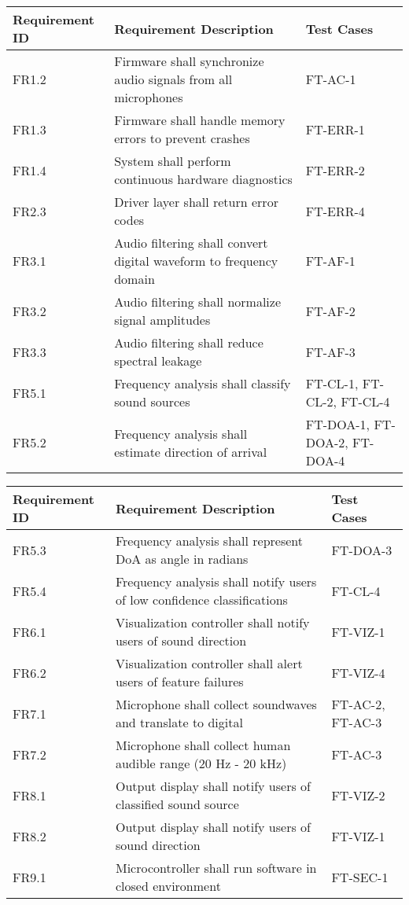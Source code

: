 \documentclass[12pt, titlepage]{article}
\begin{document}
\noindent
\begin{tabular}{|p{3cm}|p{8cm}|p{3cm}|}
\hline
\textbf{Requirement ID} & \textbf{Requirement Description} & \textbf{Test Cases} \\
\hline
FR1.2 & Firmware shall synchronize audio signals from all microphones & FT-AC-1 \\
\hline
FR1.3 & Firmware shall handle memory errors to prevent crashes & FT-ERR-1 \\
\hline
FR1.4 & System shall perform continuous hardware diagnostics & FT-ERR-2 \\
\hline
FR2.3 & Driver layer shall return error codes & FT-ERR-4 \\
\hline
FR3.1 & Audio filtering shall convert digital waveform to frequency domain & FT-AF-1 \\
\hline
FR3.2 & Audio filtering shall normalize signal amplitudes & FT-AF-2 \\
\hline
FR3.3 & Audio filtering shall reduce spectral leakage & FT-AF-3 \\
\hline
FR5.1 & Frequency analysis shall classify sound sources & FT-CL-1, FT-CL-2, FT-CL-4 \\
\hline
FR5.2 & Frequency analysis shall estimate direction of arrival & FT-DOA-1, FT-DOA-2, FT-DOA-4 \\
\hline
\end{tabular}

\vspace{1em}

\noindent
\begin{tabular}{|p{3cm}|p{8cm}|p{3cm}|}
\hline
\textbf{Requirement ID} & \textbf{Requirement Description} & \textbf{Test Cases} \\
\hline
FR5.3 & Frequency analysis shall represent DoA as angle in radians & FT-DOA-3 \\
\hline
FR5.4 & Frequency analysis shall notify users of low confidence classifications & FT-CL-4 \\
\hline
FR6.1 & Visualization controller shall notify users of sound direction & FT-VIZ-1 \\
\hline
FR6.2 & Visualization controller shall alert users of feature failures & FT-VIZ-4 \\
\hline
FR7.1 & Microphone shall collect soundwaves and translate to digital & FT-AC-2, FT-AC-3 \\
\hline
FR7.2 & Microphone shall collect human audible range (20 Hz - 20 kHz) & FT-AC-3 \\
\hline
FR8.1 & Output display shall notify users of classified sound source & FT-VIZ-2 \\
\hline
FR8.2 & Output display shall notify users of sound direction & FT-VIZ-1 \\
\hline
FR9.1 & Microcontroller shall run software in closed environment & FT-SEC-1 \\
\hline
\end{tabular}
\end{document}
